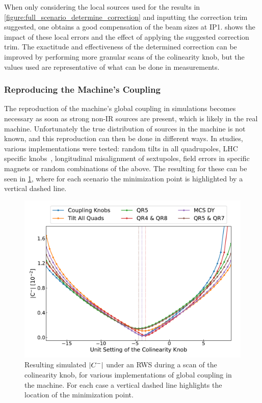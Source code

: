 When only considering the local sources used for the results in \cref{figure:full_scenario_determine_correction} and inputting the correction trim suggested, one obtains a good compensation of the beam sizes at IP\num{1}.
 shows the impact of these local errors and the effect of applying the suggested correction trim.
The exactitude and effectiveness of the determined correction can be improved by performing more granular scans of the colinearity knob, but the values used are representative of what can be done in measurements.

\subsubsection*{Reproducing the Machine's Coupling}

The reproduction of the machine's global coupling in simulations becomes necessary as soon as strong non-IR sources are present, which is likely in the real machine.
Unfortunately the true distribution of sources in the machine is not known, and this reproduction can then be done in different ways.
In studies, various implementations were tested: random tilts in all quadrupoles, LHC specific knobs~\cite{CERN:Tomas:Optimizing_Global_Coupling_Knobs_LHC}, longitudinal misalignment of sextupoles, field errors in specific magnets or random combinations of the above.
The resulting  for these can be seen in \cref{figure:global_coupling_modeling_impact}, where for each scenario the minimization point is highlighted by a vertical dashed line.

\begin{figure}[!hbt]
    \centering
    \includegraphics*[width=\textwidth]{Figures/IR_Coupling_Correction/global_sources_influence.pdf}
    \caption{Resulting simulated \(\left\lvert C^{-} \right\rvert\) under an RWS during a scan of the colinearity knob, for various implementations of global coupling in the machine. For each case a vertical dashed line highlights the location of the minimization point.}
    \label{figure:global_coupling_modeling_impact}
\end{figure}

